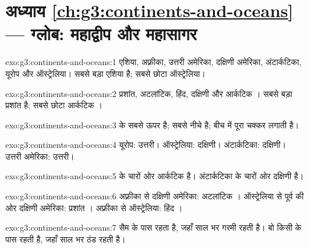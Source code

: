 \section*{अध्याय \ref{ch:g3:continents-and-oceans} --- ग्लोब: महाद्वीप और महासागर}

\begin{solution}{exo:g3:continents-and-oceans:1}
एशिया, अफ़्रीका, उत्तरी अमेरिका, दक्षिणी अमेरिका, अंटार्कटिका, यूरोप और
ऑस्ट्रेलिया। सबसे बड़ा एशिया है; सबसे छोटा ऑस्ट्रेलिया।
\end{solution}

\begin{solution}{exo:g3:continents-and-oceans:2}
प्रशांत, अटलांटिक, हिंद, दक्षिणी और आर्कटिक । सबसे बड़ा प्रशांत
 है; सबसे छोटा आर्कटिक ।
\end{solution}

\begin{solution}{exo:g3:continents-and-oceans:3}
  के सबसे ऊपर है;  सबसे नीचे है; 
बीच में पूरा चक्कर लगाती है।
\end{solution}

\begin{solution}{exo:g3:continents-and-oceans:4}
यूरोप: उत्तरी। ऑस्ट्रेलिया: दक्षिणी। अंटार्कटिका: दक्षिणी। उत्तरी अमेरिका:
उत्तरी।
\end{solution}

\begin{solution}{exo:g3:continents-and-oceans:5}
 के चारों ओर आर्कटिक  है। अंटार्कटिका के चारों ओर दक्षिणी
 है।
\end{solution}

\begin{solution}{exo:g3:continents-and-oceans:6}
अफ़्रीका से दक्षिणी अमेरिका: अटलांटिक । ऑस्ट्रेलिया से पूर्व की ओर
दक्षिणी अमेरिका: प्रशांत । अफ़्रीका से ऑस्ट्रेलिया: हिंद ।
\end{solution}

\begin{solution}{exo:g3:continents-and-oceans:7}
सैम  के पास रहता है, जहाँ साल भर गरमी रहती है। बो किसी  के
पास रहती है, जहाँ साल भर ठंड रहती है।
\end{solution}

